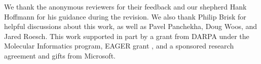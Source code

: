 \documentclass[sigplan, screen]{acmart}
\begin{document}
\begin{acks}
  We thank the anonymous reviewers for their feedback and our shepherd Hank Hoffmann for his guidance during the revision.
  We also thank Philip Brisk for helpful discussions about this work, as well as Pavel Panchekha, Doug Woos, and Jared Roesch.
  This work supported in part by a grant from DARPA under the Molecular Informatics program,
  EAGER grant
  , and a sponsored research agreement and gifts from Microsoft.
\end{acks}



\end{document}
